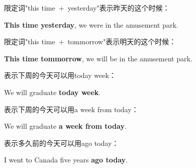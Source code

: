 \documentclass[UTF8]{ctexart}
\newcommand{\littf}[1]{{\hspace{3pt}\ttfamily #1}}
\begin{document}
    限定词\littf{"this time~+~yesterday"}表示昨天的这个时候：
    \begin{center}
        \ttfamily\large
        \textbf{This time yesterday}, we were in the amusement park.\\[6mm]
    \end{center}
    限定词\littf{"this time~+~tommorrow"}表示明天的这个时候：
    \begin{center}
        \ttfamily\large
        \textbf{This time tommorrow}, we will be in the amusement park.\\[6mm]
    \end{center}

\newpage

    表示下周的今天可以用\littf{today week}：
    \begin{center}
        \ttfamily\large
        We will graduate \textbf{today week}.\\[6mm]
    \end{center}
    表示下周的今天可以用\littf{a week from today}：
    \begin{center}
        \ttfamily\large
        We will graduate \textbf{a week from today}.\\[6mm]
    \end{center}
    表示多久前的今天可以用\littf{ago today}：
    \begin{center}
        \ttfamily\large
        I went to Canada five years \textbf{ago today}.\\[6mm]
    \end{center}
\end{document}
